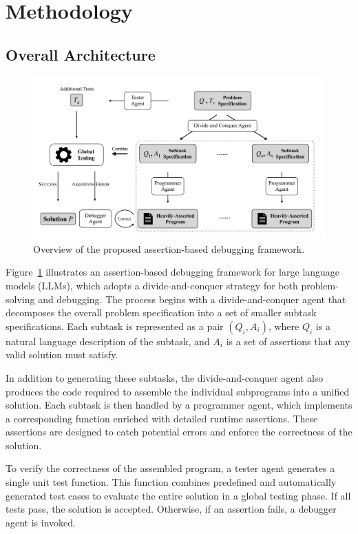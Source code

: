 
\section{Methodology}

\subsection{Overall Architecture}

\begin{figure}
    \centering
    \includegraphics[width=\linewidth]{Architecture.pdf}
    \caption{Overview of the proposed assertion-based debugging framework.}
    \label{fig:overview}
\end{figure}

Figure~\ref{fig:overview} illustrates an assertion-based debugging framework for large language models (LLMs), which adopts a divide-and-conquer strategy for both problem-solving and debugging. The process begins with a divide-and-conquer agent that decomposes the overall problem specification into a set of smaller subtask specifications. Each subtask is represented as a pair $(Q_i, A_i)$, where $Q_i$ is a natural language description of the subtask, and $A_i$ is a set of assertions that any valid solution must satisfy.

In addition to generating these subtasks, the divide-and-conquer agent also produces the code required to assemble the individual subprograms into a unified solution. Each subtask is then handled by a programmer agent, which implements a corresponding function enriched with detailed runtime assertions. These assertions are designed to catch potential errors and enforce the correctness of the solution.

To verify the correctness of the assembled program, a tester agent generates a single unit test function. This function combines predefined and automatically generated test cases to evaluate the entire solution in a global testing phase. If all tests pass, the solution is accepted. Otherwise, if an assertion fails, a debugger agent is invoked.

